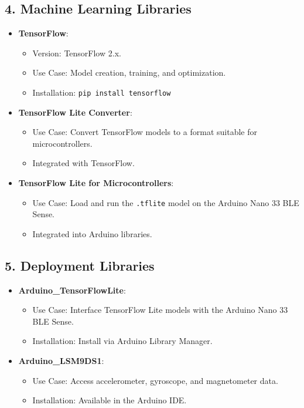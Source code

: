 \subsection{4. Machine Learning Libraries}
\begin{itemize}
    \item \textbf{TensorFlow}: 
    \begin{itemize}
        \item Version: TensorFlow 2.x.
        \item Use Case: Model creation, training, and optimization.
        \item Installation: \texttt{pip install tensorflow}
    \end{itemize}
    \item \textbf{TensorFlow Lite Converter}: 
    \begin{itemize}
        \item Use Case: Convert TensorFlow models to a format suitable for microcontrollers.
        \item Integrated with TensorFlow.
    \end{itemize}
    \item \textbf{TensorFlow Lite for Microcontrollers}: 
    \begin{itemize}
        \item Use Case: Load and run the \texttt{.tflite} model on the Arduino Nano 33 BLE Sense.
        \item Integrated into Arduino libraries.
    \end{itemize}
\end{itemize}

\subsection{5. Deployment Libraries}
\begin{itemize}
    \item \textbf{Arduino\_TensorFlowLite}: 
    \begin{itemize}
        \item Use Case: Interface TensorFlow Lite models with the Arduino Nano 33 BLE Sense.
        \item Installation: Install via Arduino Library Manager.
    \end{itemize}
    \item \textbf{Arduino\_LSM9DS1}: 
    \begin{itemize}
        \item Use Case: Access accelerometer, gyroscope, and magnetometer data.
        \item Installation: Available in the Arduino IDE.
    \end{itemize}
\end{itemize}

